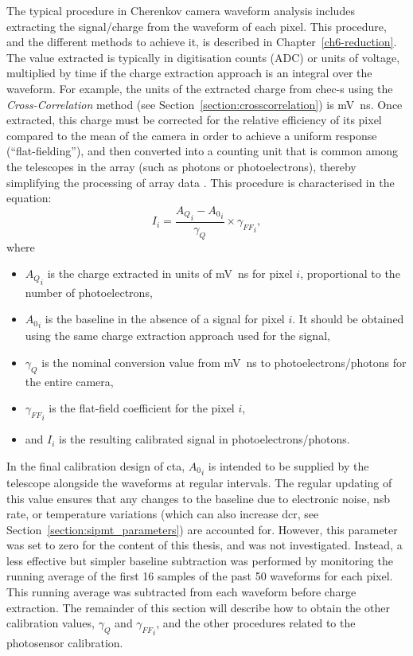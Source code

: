 The typical procedure in Cherenkov camera waveform analysis includes extracting the signal/charge from the waveform of each pixel. This procedure, and the different methods to achieve it, is described in Chapter~\ref{ch6-reduction}. The value extracted is typically in digitisation counts (ADC) or units of voltage, multiplied by time if the charge extraction approach is an integral over the waveform. For example, the units of the extracted charge from \gls{chec-s} using the \textit{Cross-Correlation} method (see Section~\ref{section:crosscorrelation}) is \si{mV ns}. Once extracted, this charge must be corrected for the relative efficiency of its pixel compared to the mean of the camera in order to achieve a uniform response (``flat-fielding''), and then converted into a counting unit that is common among the telescopes in the array (such as photons or photoelectrons), thereby simplifying the processing of array data \cite{Aharonian2004}. This procedure is characterised in the equation: 
\begin{equation} \label{eq:photosensor_calibration}
I_i = \frac{{A_Q}_i - {A_0}_i}{\gamma_{Q}} \times {\gamma_{FF}}_i,
\end{equation}
where 
\begin{itemize}
\item ${A_Q}_i$ is the charge extracted in units of \si{mV ns} for pixel $i$, proportional to the number of photoelectrons,
\item ${A_0}_i$ is the baseline in the absence of a signal for pixel $i$. It should be obtained using the same charge extraction approach used for the signal,
\item $\gamma_{Q}$ is the nominal conversion value from \si{mV ns} to photoelectrons/photons for the entire camera,
\item ${\gamma_{FF}}_i$ is the flat-field coefficient for the pixel $i$,
\item and $I_i$ is the resulting calibrated signal in photoelectrons/photons.
\end{itemize}

In the final calibration design of \gls{cta}, ${A_0}_i$ is intended to be supplied by the telescope alongside the waveforms at regular intervals. The regular updating of this value ensures that any changes to the baseline due to electronic noise, \gls{nsb} rate, or temperature variations (which can also increase \gls{dcr}, see Section~\ref{section:sipmt_parameters}) are accounted for. However, this parameter was set to zero for the content of this thesis, and was not investigated. Instead, a less effective but simpler baseline subtraction was performed by monitoring the running average of the first 16 samples of the past 50 waveforms for each pixel. This running average was subtracted from each waveform before charge extraction. The remainder of this section will describe how to obtain the other calibration values, $\gamma_{Q}$ and ${\gamma_{FF}}_i$, and the other procedures related to the photosensor calibration.


